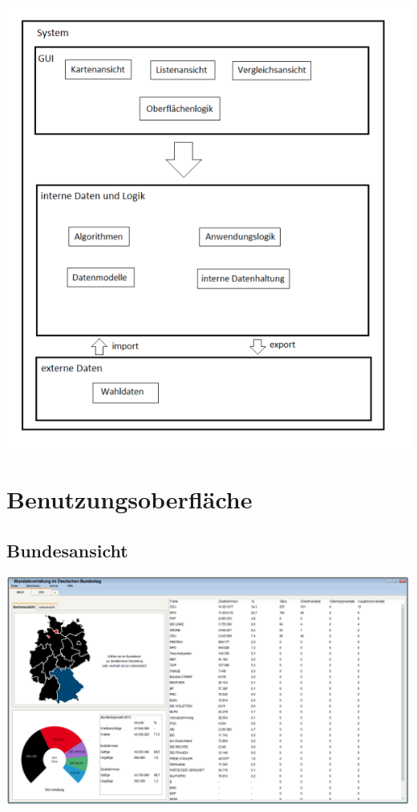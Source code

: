 \documentclass[10pt,a4paper]{article}
\begin{document}
\includegraphics[scale=0.5]{Systemuebersicht.png}

\section{Benutzungsoberfläche}
\subsection{Bundesansicht}
\includegraphics[scale=0.3]{Bundesansicht.png}
\newpage
\end{document}
